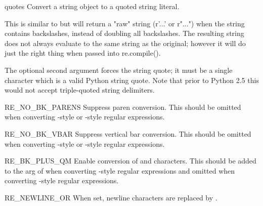 \begin{funcdesc}{quote}{s}
 Convert a string object to a quoted string literal.

 This is similar to  but will return a "raw" string (r'...'
 or r"...") when the string contains backslashes, instead of doubling all
 backslashes.  The resulting string does not always evaluate to the same
 string as the original; however it will do just the right thing when passed
 into re.compile().

 The optional second argument forces the string quote; it must be a single
 character which is a valid Python string quote.  Note that prior to Python
 2.5 this would not accept triple-quoted string delimiters.
\end{funcdesc}

\begin{datadesc}{RE_NO_BK_PARENS}
 Suppress paren conversion.  This should be omitted when converting
 -style or -style regular expressions.
\end{datadesc}

\begin{datadesc}{RE_NO_BK_VBAR}
 Suppress vertical bar conversion.  This should be omitted when converting
 -style or -style regular expressions.
\end{datadesc}

\begin{datadesc}{RE_BK_PLUS_QM}
 Enable conversion of \code{+} and  characters.  This should be
 added to the  arg of  when converting
 -style regular expressions and omitted when converting
 -style regular expressions.
\end{datadesc}

\begin{datadesc}{RE_NEWLINE_OR}
 When set, newline characters are replaced by \code{|}.
\end{datadesc}
